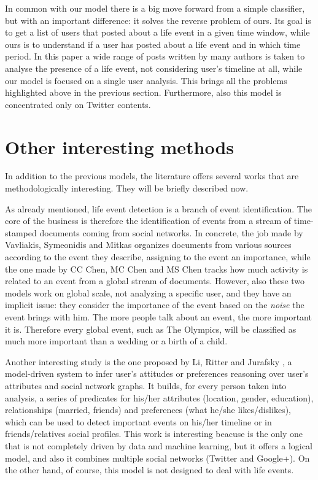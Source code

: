 In common with our model there is a big move forward from a simple classifier, but with an important difference: it solves the reverse problem of ours. Its goal is to get a list of users that posted about a life event in a given time window, while ours is to understand if a user has posted about a life event and in which time period. In this paper a wide range of posts written by many authors is taken to analyse the presence of a life event, not considering user's timeline at all, while our model is focused on a single user analysis. This brings all the problems highlighted above in the previous section. Furthermore, also this model is  concentrated only on Twitter contents.

\section{Other interesting methods}
In addition to the previous models, the literature offers several works that are methodologically interesting. They will be briefly described now.

As already mentioned, life event detection is a branch of event identification. The core of the business is therefore the identification of events from a stream of time-stamped documents coming from social networks. In concrete, the job made by Vavliakis, Symeonidis and Mitkas \cite{vavliakis2013event} organizes documents from various sources according to the event they describe, assigning to the event an importance, while the one made by CC Chen, MC Chen and MS Chen \cite{chen2009adaptive} tracks how much activity is related to an event from a global stream of documents. However, also these two models work on global scale, not analyzing a specific user, and they have an implicit issue: they consider the importance of the event based on the \textit{noise} the event brings with him. The more people talk about an event, the more important it is. Therefore every global event, such as The Olympics, will be classified as much more important than a wedding or a birth of a child.

Another interesting study is the one proposed by Li, Ritter and Jurafsky \cite{li2014inferring}, a model-driven system to infer user's attitudes or preferences reasoning over user's attributes and social network graphs. It builds, for every person taken into analysis, a series of predicates for his/her attributes (location, gender, education), relationships (married, friends) and preferences (what he/she likes/dislikes), which can be used to detect important events on his/her timeline or in friends/relatives social profiles. This work is interesting beacuse is the only one that is not completely driven by data and machine learning, but it offers a logical model, and also it combines multiple social networks (Twitter and Google+). On the other hand, of course, this model is not designed to deal with life events.

